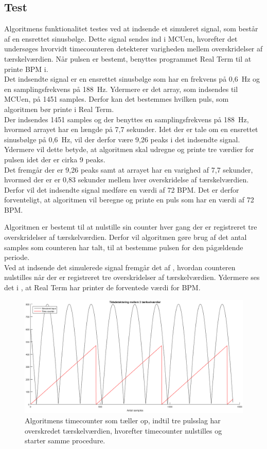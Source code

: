\subsection{Test}
Algoritmens funktionalitet testes ved at indsende et simuleret signal, som består af en ensrettet sinusbølge. Dette signal sendes ind i MCUen, hvorefter det undersøges hvorvidt timecounteren detekterer varigheden mellem overskridelser af tærskelværdien. Når pulsen er bestemt, benyttes programmet Real Term til at printe BPM i. \\
Det indsendte signal er en ensrettet sinusbølge som har en frekvens på 0,6~Hz og en samplingsfrekvens på 188~Hz. Ydermere er det array, som indsendes til MCUen, på 1451 samples. Derfor kan det bestemmes hvilken puls, som algoritmen bør printe i Real Term. \\
Der indsendes 1451 samples og der benyttes en samplingsfrekvens på 188~Hz, hvormed arrayet har en længde på 7,7 sekunder. Idet der er tale om en ensrettet sinusbølge på 0,6~Hz, vil der derfor være 9,26 peaks i det indsendte signal. Ydermere vil dette betyde, at algoritmen skal udregne og printe tre værdier for pulsen idet der er cirka 9 peaks. \\
Det fremgår der er 9,26 peaks samt at arrayet har en varighed af 7,7 sekunder, hvormed der er er 0,83 sekunder mellem hver overskridelse af tærskelværdien. Derfor vil det indsendte signal medføre en værdi af 72 BPM. Det er derfor forventeligt, at algoritmen vil beregne og printe en puls som har en værdi af 72 BPM. 

Algoritmen er bestemt til at nulstille sin counter hver gang der er registreret tre overskridelser af tærskelværdien. Derfor vil algoritmen gøre brug af det antal samples som counteren har talt, til at bestemme pulsen for den pågældende periode. \\
Ved at indsende det simulerede signal fremgår det af , hvordan counteren nulstilles når der er registreret tre overskridelser af tærskelværdien. Ydermere ses det i , at Real Term har printer de forventede værdi for BPM.

\begin{figure}[H]
	\centering
	\includegraphics[scale=0.46]{figures/cDesign/timecounter_puls_pic.png}
	\caption{Algoritmens timecounter som tæller op, indtil tre pulsslag har overskredet tærskelværdien, hvorefter timecounter nulstilles og starter samme procedure.}
\label{fig:timecounter_puls_realterm}
\end{figure}

